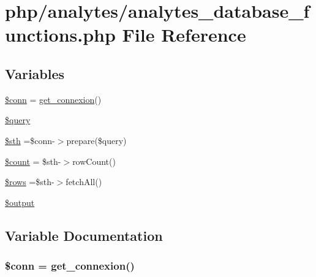 \hypertarget{analytes__database__functions_8php}{\section{php/analytes/analytes\-\_\-database\-\_\-functions.php File Reference}
\label{analytes__database__functions_8php}
}
\subsection*{Variables}
\begin{DoxyCompactItemize}
\item 
\hyperlink{analytes__database__functions_8php_aa8a5a87b9c1a6a0819b88447cbe41877}{\$conn} = \hyperlink{php__functions_8php_ace18bc10f3fd08f92688ac743e0d8c2e}{get\-\_\-connexion}()
\item 
\hyperlink{analytes__database__functions_8php_af59a5f7cd609e592c41dc3643efd3c98}{\$query}
\item 
\hyperlink{analytes__database__functions_8php_afa9126f9664959c02795be300a135f93}{\$sth} =\$conn-\/$>$prepare(\$query)
\item 
\hyperlink{analytes__database__functions_8php_af789423037bbc89dc7c850e761177570}{\$count} = \$sth-\/$>$row\-Count()
\item 
\hyperlink{analytes__database__functions_8php_ace2ec39e7df3899fa8df9640ec274b03}{\$rows} =\$sth-\/$>$fetch\-All()
\item 
\hyperlink{analytes__database__functions_8php_a73004ce9cd673c1bfafd1dc351134797}{\$output}
\end{DoxyCompactItemize}


\subsection{Variable Documentation}
\hypertarget{analytes__database__functions_8php_aa8a5a87b9c1a6a0819b88447cbe41877}{
\subsubsection[{\$conn}]{\setlength{\rightskip}{0pt plus 5cm}\$conn = {\bf get\-\_\-connexion}()}}\label{analytes__database__functions_8php_aa8a5a87b9c1a6a0819b88447cbe41877}


